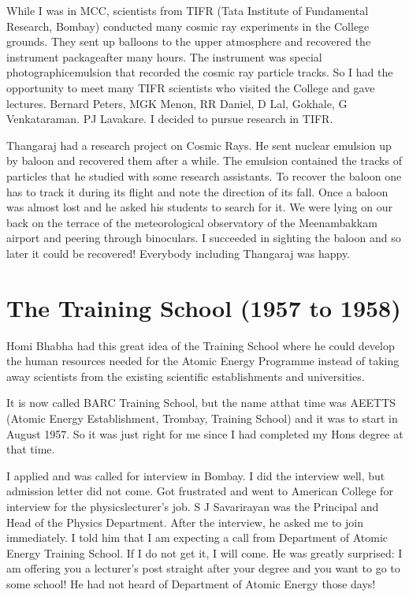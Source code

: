 While I was in MCC, scientists from TIFR (Tata Institute of Fundamental 
Research, Bombay) conducted many cosmic ray experiments in the College 
grounds. They sent up balloons to the upper atmosphere and recovered the 
instrument package\break after many hours. The instrument was special 
photographic\break emulsion that recorded the cosmic ray particle tracks. So I\break 
had the opportunity to meet many TIFR scientists who visited the College 
and gave lectures. Bernard Peters, MGK Menon, RR Daniel, D Lal, Gokhale, 
G Venkataraman. PJ Lavakare. I decided to pursue research in TIFR.

Thangaraj had a research project on Cosmic Rays. He sent nuclear 
emulsion up by baloon and recovered them after a while. The emulsion 
contained the tracks of particles that he studied with some research 
assistants. To recover the baloon one has to track it during its flight 
and note the direction of its fall. Once a baloon was almost lost and he 
asked his students to search for it. We were lying on our back on the 
terrace of the meteorological observatory of the Meenambakkam airport 
and peering through binoculars. I succeeded in sighting the baloon and 
so later it could be recovered! Everybody including Thangaraj was happy.
\vspace{-\topsep}
\section*{The Training School (1957 to 1958)}

Homi Bhabha had this great idea of the Training School where he could develop the human resources needed for the Atomic Energy Programme instead of taking away scientists from the existing scientific establishments and universities.   

It is now called BARC Training School, but the name at\break that time was AEETTS (Atomic Energy Establishment, Trombay, Training School) and it was to start in August 1957. So it was just right for me since I had completed my Hons degree at that time.

I applied and was called for interview in Bombay. I did the interview 
well, but admission letter did not come. Got frustrated and went to 
American College for interview for the physics\break lecturer's job. S J 
Savarirayan was the Principal and Head of the Physics Department. After 
the interview, he asked me to join immedi\-ately. I told him that I am 
expecting a call from Department of Atomic Energy Training School. If I 
do not get it, I will come. He was greatly surprised: I am offering you 
a lecturer's post straight after your degree and you want to go to some 
school! He had not heard of Department of Atomic Energy those days! 

